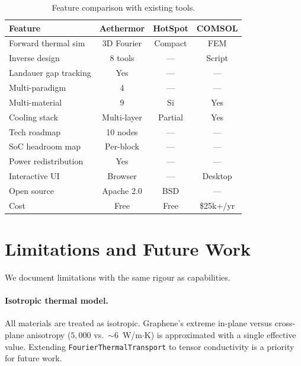 \documentclass[11pt,twocolumn]{article}
\begin{document}
\begin{table}[t]
\centering
\caption{Feature comparison with existing tools.}
\label{tab:comparison}
\small
\begin{tabular}{@{}lccc@{}}
\toprule
Feature & Aethermor & HotSpot & COMSOL \\
\midrule
Forward thermal sim      & 3D Fourier & Compact & FEM \\
Inverse design           & 8 tools    & ---     & Script \\
Landauer gap tracking    & Yes        & ---     & --- \\
Multi-paradigm           & 4          & ---     & --- \\
Multi-material           & 9          & Si      & Yes \\
Cooling stack            & Multi-layer & Partial & Yes \\
Tech roadmap             & 10 nodes   & ---     & --- \\
SoC headroom map         & Per-block  & ---     & --- \\
Power redistribution     & Yes        & ---     & --- \\
Interactive UI           & Browser    & ---     & Desktop \\
Open source              & Apache 2.0 & BSD     & --- \\
Cost                     & Free       & Free    & \$25k+/yr \\
\bottomrule
\end{tabular}
\end{table}


\section{Limitations and Future Work}
\label{sec:limitations}

We document limitations with the same rigour as capabilities.

\paragraph{Isotropic thermal model.}
All materials are treated as isotropic. Graphene's extreme in-plane
versus cross-plane anisotropy ($5{,}000$ vs.\ $\sim$6~W/m$\cdot$K)
is approximated with a single effective value. Extending
\texttt{FourierThermalTransport} to tensor conductivity is a priority
for future work.
\end{document}
